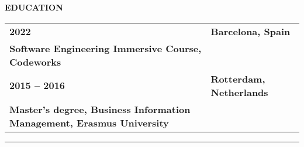 \begin{center}
\textbf{EDUCATION}
\end{center}

\vspace{0.3cm}

\begin{longtable}{p{}p{}}
\textbf{2022} & \textbf{Barcelona, Spain} \\
\textbf{Software Engineering Immersive Course, Codeworks} & \\

\textbf{2015 – 2016} & \textbf{Rotterdam, Netherlands} \\
\textbf{Master's degree, Business Information Management, Erasmus University} & \\
\end{longtable}

\vspace{0.5cm}
\rule{\textwidth}{0.5pt}
\vspace{0.5cm} 